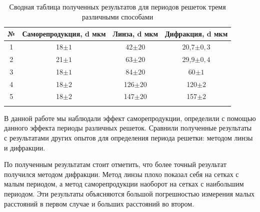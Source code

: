 \documentclass[a4paper, 12pt]{article}%
\begin{document}
\begin{enumerate}
\begin{longtable}{|c|c|c|c|}
			№ & Саморепродукция, d мкм & Линза, d мкм & Дифракция, d мкм \\ \hline
			1 & 18$\pm 1$ & 42$\pm 20$& 20,7$\pm 0,3$\\ \hline
			2 & 21$\pm 1$ & 63$\pm 20$ & 29,9$\pm 0,4$\\ \hline
			3 & 18$\pm 1$ & 84$\pm 20$ & 60$\pm 1$\\ \hline
			4 & 18$\pm 2$ & 126$\pm 20$ & 120$\pm 2$\\ \hline
			5 & 18$\pm 2$ & 147$\pm 20$ & 157$\pm 2$\\ \hline
			\caption{Сводная таблица полученных результатов для периодов решеток тремя различными способами}
		\end{longtable}
		
		В данной работе мы наблюдали эффект саморепродукции, определили с помощью данного эффекта периоды различных решеток. Сравнили полученные результаты с результатами других опытов для определения периода решетки: методом линзы и дифракции.
		
		По полученным результатам стоит отметить, что более точный результат получился методом дифракции. Метод линзы плохо показал себя на сетках с малым периодом, а метод саморепродукции наоборот на сетках с наибольшим периодом. Эти результаты объясняются большой погрешностью измерения малых расстояний в первом случае и больших расстояний во втором.
		
		
		
	\end{enumerate}
	
	
\end{document}

